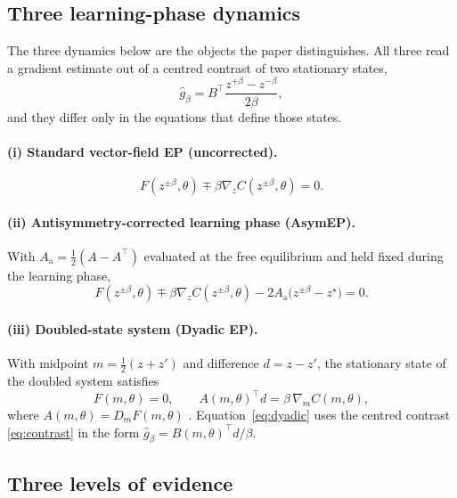 \documentclass[11pt]{article}
\theoremstyle{definition}
\theoremstyle{remark}
\newcommand{\grad}{\nabla}
\begin{document}
\subsection{Three learning-phase dynamics}

The three dynamics below are the objects the paper distinguishes. All three read a gradient
estimate out of a centred contrast of two stationary states,
\begin{equation}
\widehat{g}_\beta = B^{\top}\frac{z^{+\beta} - z^{-\beta}}{2\beta},
\label{eq:contrast}
\end{equation}
and they differ only in the equations that define those states.

\paragraph{(i) Standard vector-field EP (uncorrected).}
\begin{equation}
F(z^{\pm\beta},\theta) \mp \beta \grad_z C(z^{\pm\beta},\theta) = 0 .
\label{eq:vf}
\end{equation}

\paragraph{(ii) Antisymmetry-corrected learning phase (AsymEP).}
With $A_{\mathrm a} = \tfrac12 (A - A^{\top})$ evaluated at the free equilibrium and held fixed
during the learning phase,
\begin{equation}
F(z^{\pm\beta},\theta) \mp \beta \grad_z C(z^{\pm\beta},\theta) - 2A_{\mathrm a}\bigl(z^{\pm\beta} - z^\star\bigr) = 0 .
\label{eq:asym}
\end{equation}

\paragraph{(iii) Doubled-state system (Dyadic EP).}
With midpoint $m = \tfrac12 (z + z')$ and difference $d = z - z'$, the stationary state of the
doubled system satisfies
\begin{equation}
F(m,\theta) = 0, \qquad A(m,\theta)^{\top} d = \beta\, \grad_m C(m,\theta),
\label{eq:dyadic}
\end{equation}
where $A(m,\theta) = D_m F(m,\theta)$ \cite{scurria2026}. Equation~\eqref{eq:dyadic} uses the
centred contrast \eqref{eq:contrast} in the form $\widehat{g}_\beta = B(m,\theta)^{\top} d/\beta$.

\subsection{Three levels of evidence}
\end{document}
